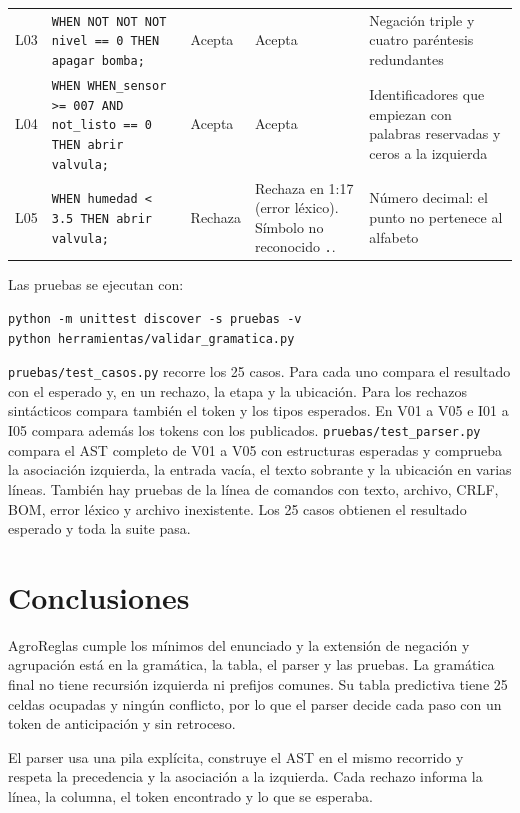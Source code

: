 \documentclass[11pt,a4paper]{article}
\begin{document}
\begin{xltabular}{\textwidth}{l Y{1.0} l Y{1.3} Y{0.7}}
  L03 & \texttt{WHEN NOT NOT NOT
    nivel ==
  0 THEN apagar bomba;}
  & Acepta & Acepta & Negación triple y cuatro paréntesis redundantes \\
  L04 & \texttt{WHEN WHEN\_\allowbreak{}sensor >= 007 AND
  not\_\allowbreak{}listo == 0 THEN abrir valvula;} & Acepta & Acepta &
  Identificadores que empiezan con palabras reservadas y ceros a la izquierda \\
  L05 & \texttt{WHEN humedad < 3.5 THEN abrir valvula;} & Rechaza &
  Rechaza en 1:17 (error léxico). Símbolo no reconocido \texttt{.}. &
  Número decimal: el punto no pertenece al alfabeto \\
  \bottomrule
\end{xltabular}
\endgroup

Las pruebas se ejecutan con:

\begin{Verbatim}
python -m unittest discover -s pruebas -v
python herramientas/validar_gramatica.py
\end{Verbatim}

\texttt{pruebas/test\_casos.py} recorre los 25 casos. Para cada uno
compara el resultado con el esperado y, en un rechazo, la etapa y la
ubicación. Para los rechazos sintácticos compara también el token y
los tipos esperados. En V01 a V05 e I01 a I05
compara además los tokens con los publicados.
\texttt{pruebas/test\_parser.py} compara el AST completo de V01 a V05
con estructuras esperadas y comprueba la asociación izquierda, la
entrada vacía, el texto sobrante y la ubicación en varias líneas.
También hay pruebas de la línea de comandos con texto, archivo, CRLF,
BOM, error léxico y archivo inexistente. Los 25 casos obtienen el
resultado esperado y toda la suite pasa.

\section{Conclusiones}

AgroReglas cumple los mínimos del enunciado y la extensión de
negación y agrupación está en la gramática, la tabla, el parser y las
pruebas. La gramática final no tiene recursión izquierda ni prefijos
comunes. Su tabla predictiva tiene 25 celdas ocupadas y ningún
conflicto, por lo que el parser decide cada paso con un token de
anticipación y sin retroceso.

El parser usa una pila explícita, construye el AST en el mismo
recorrido y respeta la precedencia y la asociación a la izquierda.
Cada rechazo informa la línea, la columna, el token encontrado y lo
que se esperaba.
\end{document}

